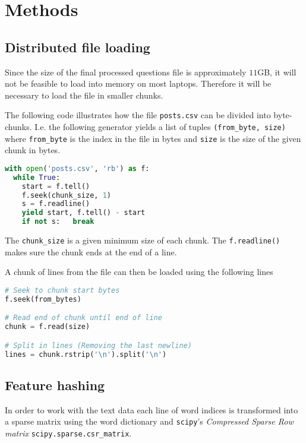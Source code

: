 
\section{Methods}

\subsection{Distributed file loading}

Since the size of the final processed questions file is approximately $11$GB,
it will not be feasible to load into memory on most laptops. Therefore it will
be necessary to load the file in smaller chunks.

The following code illustrates how the file \texttt{posts.csv} can be divided
into byte-chunks. I.e. the following generator yields a list of tuples
\texttt{(from\_byte, size)} where \texttt{from\_byte} is the index in the file in
bytes and \texttt{size} is the size of the given chunk in bytes.

\begin{lstlisting}[language=python]
with open('posts.csv', 'rb') as f:
  while True:
    start = f.tell()
    f.seek(chunk_size, 1)
    s = f.readline()
    yield start, f.tell() - start
    if not s:   break
\end{lstlisting}

The \texttt{chunk\_size} is a given minimum size of each chunk. The
\texttt{f.readline()} makes sure the chunk ends at the end of a line.

A chunk of lines from the file can then be loaded using the following lines

\begin{lstlisting}[language=python]
# Seek to chunk start bytes
f.seek(from_bytes)

# Read end of chunk until end of line
chunk = f.read(size)

# Split in lines (Removing the last newline)
lines = chunk.rstrip('\n').split('\n')
\end{lstlisting}


\subsection{Feature hashing}

In order to work with the text data each line of word indices is transformed into
a sparse matrix using the word dictionary and \texttt{scipy}'s
\textit{Compressed Sparse Row matrix} \texttt{scipy.sparse.csr\_matrix}.


